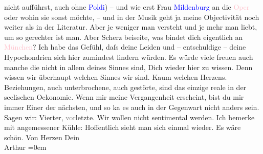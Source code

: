                nicht aufführst, auch ohne \textcolor{blue}{Poldi}{}\ledrightnote{\textcolor{blue}{Leopold von Andrian-Werburg}}) – und wie erst
               Frau \textcolor{blue}{Mildenburg}{}\ledrightnote{\textcolor{blue}{Anna Bahr-Mildenburg}} an die \textcolor{pink}{Oper}{}\ledrightnote{\textcolor{pink}{Oper}} oder wohin sie sonst möchte, – und in der Musik geht ja meine
               Objectivität noch weiter als in der Literatur. Aber je weniger man versteht und je
               mehr man liebt, um so gerechter ist man.\pend
           \pstart
           Aber Scherz beiseite, was bindet dich eigentlich an \textcolor{pink}{München}{}\ledrightnote{\textcolor{pink}{München}}? Ich habe das Gefühl, daſs deine Leiden und – entschuldige – deine
               Hypochondrien sich hier zumindest lindern würden. Es würde viele freuen auch manche
               die nicht in allem deines Sinnes sind, Dich wieder hier zu wissen. Denn wissen wir
               überhaupt {\pb}welchen
               Sinnes wir sind. Kaum welchen Herzens. Beziehungen, auch unterbrochene, auch
               gestörte, sind das einzige reale in der seelischen Oekonomie. \label{LL141-1v}\label{LL141-1h}Wenn mir meine Vergangenheit erscheint, bist du mir immer Einer
               der nächsten, und so ka{\geminationn} es auch in der Gegenwart nicht
               anders sein. \pend
           \pstart
           \label{K_L02533_2v}\label{K_L02533_2h} Sagen wir: Vierter,
                  \textcolor{gray}{vor}letzte. Wir wollen nicht sentimental \introOben{}werden.\introOben{} Ich bemerke mit angemessener Kühle: Hoffentlich sieht man sich
               einmal wieder. Es wäre schön.\pend
           \pstart
           Von Herzen Dein{\\[\baselineskip]}\spacefill\mbox{Arthur}\pend
           \leftskip=0em{}\endnumbering{}  
      